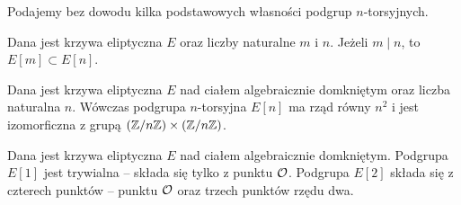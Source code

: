 Podajemy bez dowodu kilka podstawowych własności podgrup $n$-torsyjnych.

\begin{fact}
Dana jest krzywa eliptyczna $E$
oraz liczby naturalne $m$ i $n$.
Jeżeli $m \mid n$, to $E[m] \subset E[n]$.
\end{fact}

\begin{theorem}
Dana jest krzywa eliptyczna $E$ nad ciałem algebraicznie domkniętym
oraz liczba naturalna $n$.
Wówczas podgrupa $n$-torsyjna $E[n]$ ma rząd równy $n^2$
i jest izomorficzna z grupą $(\mathbb{Z} / n\mathbb{Z})\times(\mathbb{Z} / n\mathbb{Z})$.
\end{theorem}

\begin{corollary}
Dana jest krzywa eliptyczna $E$ nad ciałem algebraicznie domkniętym.
Podgrupa $E[1]$ jest trywialna -- składa się tylko z punktu $\mathcal{O}$.
Podgrupa $E[2]$ składa się z czterech punktów -- punktu $\mathcal{O}$
oraz trzech punktów rzędu dwa.
\end{corollary}
